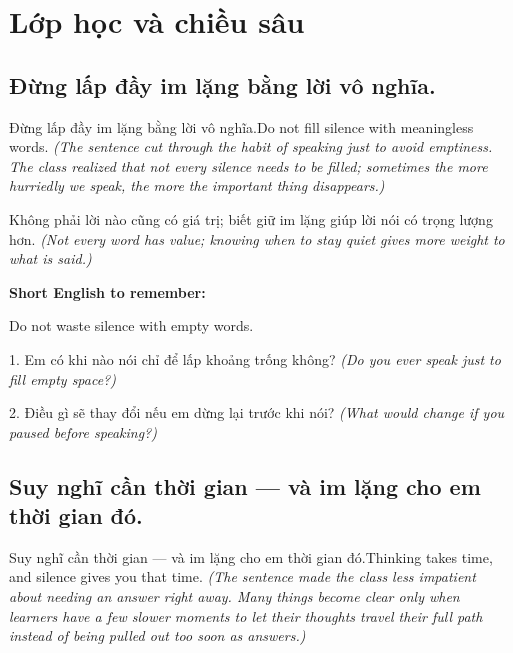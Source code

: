 \chapter{Lớp học và chiều sâu}


\section{Đừng lấp đầy im lặng bằng lời vô nghĩa.}
\begin{truyen}{Đừng lấp đầy im lặng bằng lời vô nghĩa.}{Do not fill silence with meaningless words.}
\textit{(The sentence cut through the habit of speaking just to avoid emptiness. The class realized that not every silence needs to be filled; sometimes the more hurriedly we speak, the more the important thing disappears.)}
\end{truyen}

\begin{baihoc}
Không phải lời nào cũng có giá trị; biết giữ im lặng giúp lời nói có trọng lượng hơn.
\textit{(Not every word has value; knowing when to stay quiet gives more weight to what is said.)}
\end{baihoc}

\begin{ghinhoanh}
\textbf{Short English to remember:}

Do not waste silence with empty words.

\end{ghinhoanh}

\begin{tuhocnhanh}
1. Em có khi nào nói chỉ để lấp khoảng trống không? \textit{(Do you ever speak just to fill empty space?)}

2. Điều gì sẽ thay đổi nếu em dừng lại trước khi nói? \textit{(What would change if you paused before speaking?)}
\end{tuhocnhanh}
\ngancach


\section{Suy nghĩ cần thời gian — và im lặng cho em thời gian đó.}
\begin{truyen}{Suy nghĩ cần thời gian — và im lặng cho em thời gian đó.}{Thinking takes time, and silence gives you that time.}
\textit{(The sentence made the class less impatient about needing an answer right away. Many things become clear only when learners have a few slower moments to let their thoughts travel their full path instead of being pulled out too soon as answers.)}
\end{truyen}

